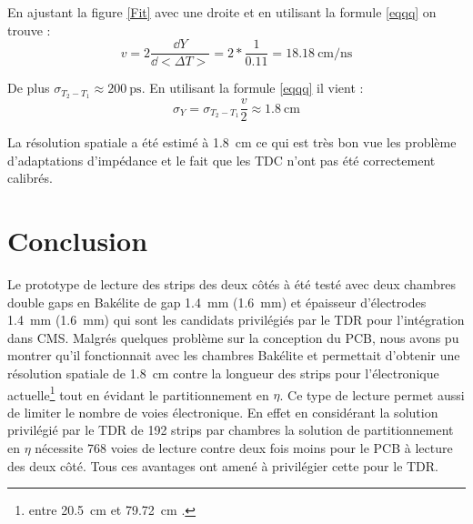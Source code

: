 En ajustant la figure \ref{Fit} avec une droite et en utilisant la formule \ref{eqqq} on trouve :
\begin{equation}
v=2\frac{\dd Y}{\dd <\Delta T>}=2*\frac{1}{0.11}=\SI{18.18}{\centi\meter\per\nano\second}
\end{equation}

De plus $\sigma_{T_2-T_1}\approx\SI{200}{\pico\second}$. En utilisant la formule \ref{eqqq} il vient :
\begin{equation}
\sigma_{Y}=\sigma_{T_2-T_1}\frac{v}{2}\approx\SI{1.8}{\centi\meter}
\end{equation}

La résolution spatiale a été estimé à \SI{1.8}{\centi\meter} ce qui est très bon vue les problème d'adaptations d'impédance et le fait que les TDC n'ont pas été correctement calibrés.

\section{Conclusion}
Le prototype de lecture des strips des deux côtés à été testé avec deux chambres double gaps en Bakélite de gap \SI{1.4}{\milli\meter} (\SI{1.6}{\milli\meter}) et épaisseur d'électrodes \SI{1.4}{\milli\meter} (\SI{1.6}{\milli\meter}) qui sont les candidats privilégiés par le TDR pour l'intégration dans CMS. Malgrés quelques problème sur la conception du PCB, nous avons pu montrer qu'il fonctionnait avec les chambres Bakélite et permettait d'obtenir une résolution spatiale de \SI{1.8}{\centi\meter} contre la longueur des strips pour l'électronique actuelle\footnote{entre \SI{20.5}{\centi\meter} et \SI{79.72}{\centi\meter} \cite{gapss}.} tout en évidant le partitionnement en $\eta$. Ce type de lecture permet aussi de limiter le nombre de voies électronique. En effet en considérant la solution privilégié par le TDR de \num{192} strips par chambres la solution de partitionnement en $\eta$ nécessite \num{768} voies de lecture contre deux fois moins pour le PCB à lecture des deux côté. Tous ces avantages ont amené à privilégier cette pour le TDR.